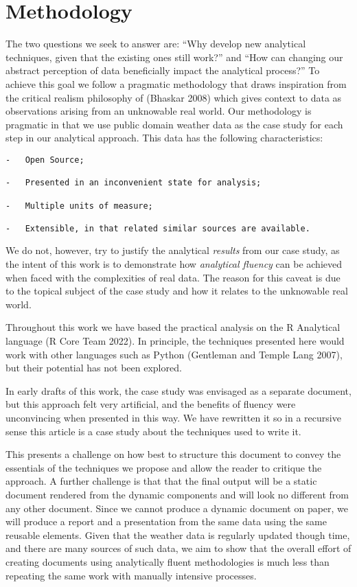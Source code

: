 \documentclass[smallextended]{svjour3}       %
\begin{document}
\hypertarget{sec:methodology}{%
\section{Methodology}\label{sec:methodology}}

The two questions we seek to answer are: ``Why develop new analytical techniques, given that the existing ones still work?'' and ``How can changing our abstract perception of data beneficially impact the analytical process?'' To achieve this goal we follow a pragmatic methodology that draws inspiration from the critical realism philosophy of (Bhaskar 2008) which gives context to data as observations arising from an unknowable real world. Our methodology is pragmatic in that we use public domain weather data as the case study for each step in our analytical approach. This data has the following characteristics:

\begin{verbatim}
-   Open Source;

-   Presented in an inconvenient state for analysis;

-   Multiple units of measure;

-   Extensible, in that related similar sources are available.
\end{verbatim}

We do not, however, try to justify the analytical \emph{results} from our case study, as the intent of this work is to demonstrate how \emph{analytical fluency} can be achieved when faced with the complexities of real data. The reason for this caveat is due to the topical subject of the case study and how it relates to the unknowable real world.

Throughout this work we have based the practical analysis on the R Analytical language (R Core Team 2022). In principle, the techniques presented here would work with other languages such as Python (Gentleman and Temple Lang 2007), but their potential has not been explored.

In early drafts of this work, the case study was envisaged as a separate document, but this approach felt very artificial, and the benefits of fluency were unconvincing when presented in this way. We have rewritten it so in a recursive sense this article is a case study about the techniques used to write it.

This presents a challenge on how best to structure this document to convey the essentials of the techniques we propose and allow the reader to critique the approach. A further challenge is that that the final output will be a static document rendered from the dynamic components and will look no different from any other document. Since we cannot produce a dynamic document on paper, we will produce a report and a presentation from the same data using the same reusable elements. Given that the weather data is regularly updated though time, and there are many sources of such data, we aim to show that the overall effort of creating documents using analytically fluent methodologies is much less than repeating the same work with manually intensive processes.
\end{document}
